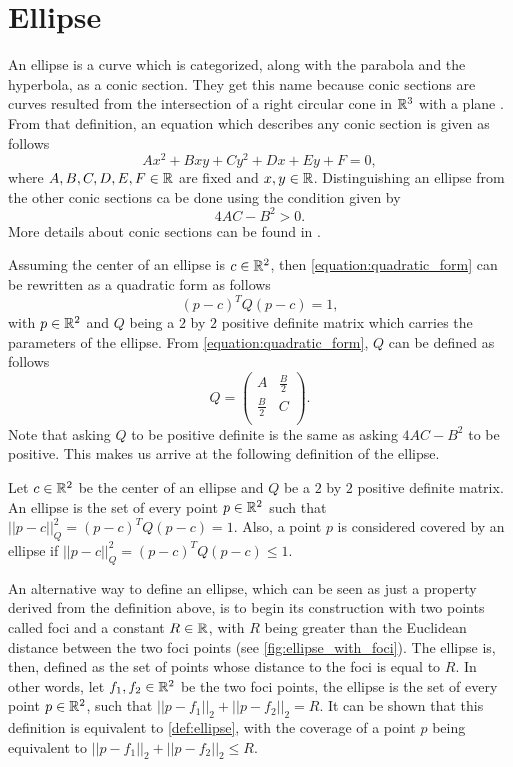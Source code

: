 \section{Ellipse}

An ellipse is a curve which is categorized, along with the parabola and the hyperbola, as a conic section. 
They get this name because conic sections are curves resulted from the intersection of a right circular cone in $\mathbb{R}^3$ with a plane \cite{brannan:geometry}. From that definition, an equation which describes any conic section is given as follows
\begin{equation}\label{equation:quadratic_form}
Ax^2 + Bxy + Cy^2 + Dx + Ey + F = 0,
\end{equation}
where $A,B,C,D,E,F \in \mathbb{R}$ are fixed and $x, y \in \mathbb{R}$. Distinguishing an ellipse from the other conic sections ca be done using the condition given by 
\begin{equation*}
4AC - B^2>0.
\end{equation*}
More details about conic sections can be found in .

Assuming the center of an ellipse is $c \in \mathbb{R}^2$, then \autoref{equation:quadratic_form} can be rewritten as a quadratic form as follows
\begin{equation*}
(p-c)^{T}Q(p-c) = 1,
\end{equation*}
with $p \in \mathbb{R}^2$ and $Q$ being a $2$ by $2$ positive definite matrix which carries the parameters of the ellipse. From \autoref{equation:quadratic_form}, $Q$ can be defined as follows
\[
Q=
\left( {\begin{array}{cc}
	A & \frac{B}{2} \\
	\frac{B}{2} & C \\
	\end{array} } \right).
\]
Note that asking $Q$ to be positive definite is the same as asking $4AC-B^2$ to be positive. This makes us arrive at the following definition of the ellipse.

\begin{definicao}\label{def:ellipse}
    Let $c\in \mathbb{R}^2$ be the center of an ellipse and $Q$ be a $2$ by $2$ positive definite matrix. An ellipse is the set of every point $p \in \mathbb{R}^2$ such that $||p-c||_{Q}^2 = (p-c)^{T}Q(p-c) = 1$. Also, a point $p$ is considered covered by an ellipse if $||p-c||_{Q}^2 = (p-c)^{T}Q(p-c) \le 1$.
\end{definicao}

An alternative way to define an ellipse, which can be seen as just a property derived from the definition above, is to begin its construction with two points called foci and a constant $R \in \mathbb{R}$, with $R$ being greater than the Euclidean distance between the two foci points (see \autoref{fig:ellipse_with_foci}). The ellipse is, then, defined as the set of points whose distance to the foci is equal to $R$. In other words, let $f_1, f_2 \in \mathbb{R}^2$ be the two foci points, the ellipse is the set of every point $p \in \mathbb{R}^2$, such that $||p-f_1||_2 + ||p-f_2||_2 = R$. It can be shown that this definition is equivalent to \autoref{def:ellipse}, with the coverage of a point $p$ being equivalent to $||p-f_1||_2 + ||p-f_2||_2 \le R$.

